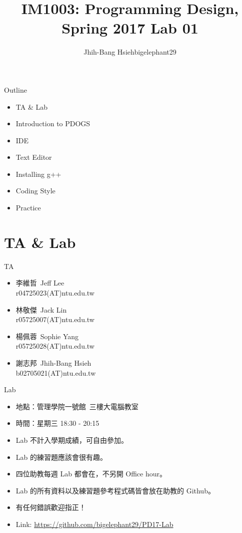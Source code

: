 \documentclass[t]{beamer}
\title{IM1003: Programming Design, Spring 2017  \linebreak Lab 01}
\author[bigelephant29]{Jhih-Bang Hsieh\linebreak \small{bigelephant29}}
\institute{\textbf{National Taiwan University}}
\date{}
\begin{document}
\begin{frame}
\maketitle
\end{frame}

\begin{frame}{Outline}
\begin{itemize}
\item TA \& Lab
\item Introduction to PDOGS
\item IDE
\item Text Editor
\item Installing g++
\item Coding Style
\item Practice
\end{itemize}
\end{frame}

\section{TA \& Lab}
\begin{frame}{TA}
\begin{itemize}
  \setlength\itemsep{1em}
\item
李維哲\ Jeff Lee\\
r04725023(AT)ntu.edu.tw
\item
林敬傑\ Jack Lin\\
r05725007(AT)ntu.edu.tw
\item
楊佩蓉\ Sophie Yang\\
r05725028(AT)ntu.edu.tw
\item
謝志邦\ Jhih-Bang Hsieh\\
b02705021(AT)ntu.edu.tw
\end{itemize}
\end{frame}

\begin{frame}{Lab}
\begin{itemize}
\item 地點：管理學院一號館\ 三樓大電腦教室
\item 時間：星期三 18:30 - 20:15
\item Lab 不計入學期成績，可自由參加。
\item Lab 的練習題應該會很有趣。
\item 四位助教每週 Lab 都會在，不另開 Office hour。
\item Lab 的所有資料以及練習題參考程式碼皆會放在助教的 Github。
\item 有任何錯誤歡迎指正！
\item Link: \href{https://github.com/bigelephant29/PD17-Lab}{https://github.com/bigelephant29/PD17-Lab}
\end{itemize}
\end{frame}
\end{document}
